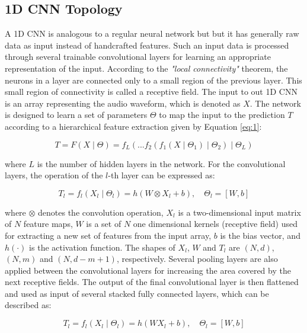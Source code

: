 \documentclass[preprint,final,12pt]{elsarticle}
\begin{document}
\subsection{1D CNN Topology}
\label{sub:Topology}
A 1D CNN is analogous to a regular neural network but but it has generally raw data as input instead of handcrafted features. Such an input data is processed through several trainable convolutional layers for learning an appropriate representation of the input. According to the \textit{"local connectivity"} theorem, the neurons in a layer are connected only to a small region of the previous layer. This small region of connectivity is called a receptive field. The input to out 1D CNN is an array representing the audio waveform, which is denoted as \(X\). The network is designed to learn a set of parameters \( \Theta \) to map the input to the prediction \(T\) according to a hierarchical feature extraction given by Equation \ref{eq:1}:

\begin{equation}
T=F(X\mid\Theta)=f_{L}(... f_{2}(f_{1}(X\mid \Theta_{1})\mid \Theta_{2})\mid \Theta_{L})
\label{eq:1}
\end{equation}

\noindent where \(L\) is the number of hidden layers in the network. For the convolutional layers, the operation of the $l$-th layer can be expressed as:

\begin{equation}
T_{l}=f_{l}(X_{l}\mid\Theta_{l})=h(W\otimes X_{l}+b),\quad \Theta_{l}=[W,b]
\end{equation}

\noindent where \(\otimes\) denotes the convolution operation, \(X_{l}\) is a two-dimensional input matrix of \(N\) feature maps, \(W\) is a set of \(N\) one dimensional kernels (receptive field) used for extracting a new set of features from the input array, \(b\) is the bias vector, and \(h(\cdot)\) is the activation function. The shapes of \(X_{l}\), \(W\) and \(T_{l}\) are \((N,d)\), \((N,m)\) and \((N,d-m+1)\), respectively. Several pooling layers are also applied between the convolutional layers for increasing the area covered by the next receptive fields. The output of the final convolutional layer is then flattened and used as input of several stacked fully connected layers, which can be described as:

\begin{equation}
T_{l}=f_{l}(X_{l}\mid\Theta_{l})=h(W X_{l}+b),\quad \Theta_{l}=[W,b]
\end{equation}
\end{document}
